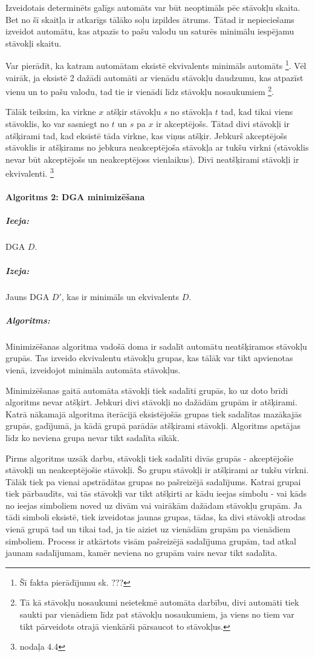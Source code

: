 Izveidotais determinēts galīgs automāts var būt neoptimāls pēc stāvokļu skaita. Bet no šī skaitļa ir atkarīgs tālāko soļu izpildes ātrums. Tātad ir nepieciešams izveidot automātu, kas atpazīs to pašu valodu un saturēs minimālu iespējamu stāvokļi skaitu.

Var pierādīt, ka katram automātam eksistē ekvivalents minimāls automāts \footnote{Šī fakta pierādījumu sk. ???}. Vēl vairāk, ja eksistē 2 dažādi automāti ar vienādu stāvokļu daudzumu, kas atpazīst vienu un to pašu valodu, tad tie ir vienādi līdz stāvokļu nosaukumiem \footnote{Tā kā stāvokļu nosaukumi neietekmē automāta darbību, divi automāti tiek saukti par vienādiem līdz pat stāvokļu nosaukumiem, ja viens no tiem var tikt pārveidots otrajā vienkārši pārsaucot to stāvokļus.}.

Tālāk teiksim, ka virkne $x$ atšķir stāvokļu $s$ no stāvokļa $t$ tad, kad tikai viens stāvoklis, ko var sasniegt no $t$ un $s$ pa $x$ ir akceptējošs. Tātad divi stāvokļi ir atšķirami tad, kad eksistē tāda virkne, kas viņus atšķir. Jebkurš akceptējošs stāvoklis ir atšķirams no jebkura neakceptējoša stāvokļa ar tukšu virkni (stāvoklis nevar būt akceptējošs un neakceptējoss vienlaikus). Divi neatšķirami stāvokļi ir ekvivalenti. \footnote{\cite{Hopcroft:IntroAutomataTheory} nodaļa 4.4}

\paragraph*{Algoritms 2: DGA minimizēšana}
\subparagraph{Ieeja:}DGA $D$.
\subparagraph{Izeja:}Jauns DGA $D'$, kas ir minimāls un ekvivalents $D$.
\subparagraph{Algoritms:} 

Minimizēšanas algoritma vadošā doma ir sadalīt automātu neatšķiramos stāvokļu grupās. Tas izveido ekvivalentu stāvokļu grupas, kas tālāk var tikt apvienotas vienā, izveidojot minimāla automāta stāvokļus.

Minimizēšanas gaitā automāta stāvokļi tiek sadalīti grupās, ko uz doto brīdi algoritms nevar atšķirt. Jebkuri divi stāvokļi no dažādām grupām ir atšķirami. Katrā nākamajā algoritma iterācijā eksistējošās grupas tiek sadalītas mazākajās grupās, gadījumā, ja kādā grupā parādās atšķirami stāvokļi. Algoritms apstājas līdz ko neviena grupa nevar tikt sadalīta sīkāk.

Pirms algoritms uzsāk darbu, stāvokļi tiek sadalīti divās grupās - akceptējošie stāvokļi un neakceptējošie stāvokļi. Šo grupu stāvokļi ir atšķirami ar tukšu virkni. Tālāk tiek pa vienai apstrādātas grupas no pašreizējā sadalījums. Katrai grupai tiek pārbaudīts, vai tās stāvokļi var tikt atšķirti ar kādu ieejas simbolu - vai kāds no ieejas simboliem noved uz divām vai vairākām dažādam stāvokļu grupām. Ja tādi simboli eksistē, tiek izveidotas jaunas grupas, tādas, ka divi stāvokļi atrodas vienā grupā tad un tikai tad, ja tie aiziet uz vienādām grupām pa vienādiem simboliem. Process ir atkārtots visām pašreizējā sadalījuma grupām, tad atkal jaunam sadalījumam, kamēr neviena no grupām vairs nevar tikt sadalīta.

